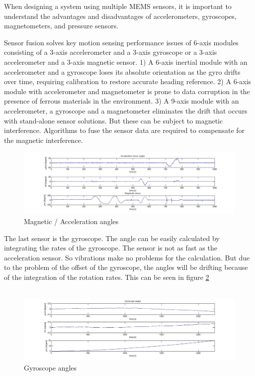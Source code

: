 When designing a system using multiple MEMS sensors, it is important to understand the advantages and disadvantages of accelerometers, gyroscopes, magnetometers, and pressure sensors.

Sensor fusion solves key motion sensing performance issues of 6-axis modules consisting of a 3-axis accelerometer and a 3-axis gyroscope or a 3-axis accelerometer and a 3-axis magnetic sensor. 1) A 6-axis inertial module with an accelerometer and a gyroscope loses its absolute orientation as the gyro drifts over time, requiring calibration to restore accurate heading reference. 2) A 6-axis module with accelerometer and magnetometer is prone to data corruption in the presence of ferrous materials in the environment. 3) A 9-axis module with an accelerometer, a gyroscope and a magnetometer eliminates the drift that occurs with stand-alone sensor solutions. But these can be subject to magnetic interference. Algorithms to fuse the sensor data are required to compensate for the magnetic interference.

\begin{figure}[H]
	\centering\includegraphics[width=1.0\textwidth]{fig/Kal_Comp/Magn_Acc.jpg}
	\caption{Magnetic / Acceleration angles}
	\label{fig:Mag_Acc}
\end{figure}

The last sensor is the gyroscope. The angle can be easily calculated by integrating the rates of the gyroscope. The sensor is not as fast as the acceleration sensor. So vibrations make no problems for the calculation. But due to the problem of the offset of the gyroscope, the angles will be drifting because of the integration of the rotation rates. This can be seen in figure \ref{fig:Comp_gyro}\\\\

\begin{figure}[H]
	\centering\includegraphics[width=1.0\textwidth]{fig/Kal_Comp/Comp_gyro.jpg}
	\caption{Gyroscope angles}
	\label{fig:Comp_gyro}
\end{figure}


